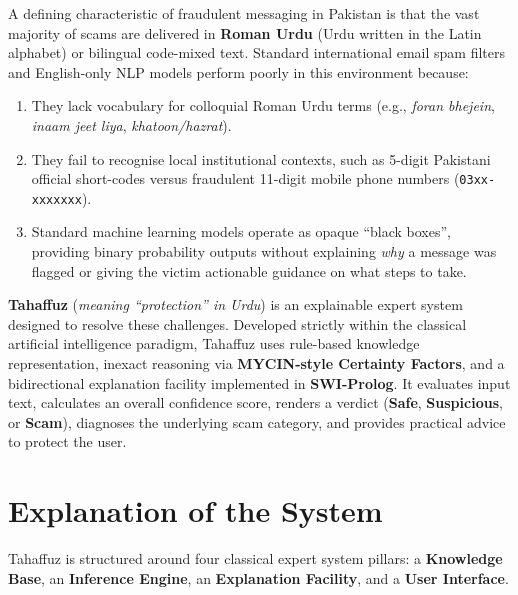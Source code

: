 \documentclass[11pt,a4paper]{article}
\begin{document}
A defining characteristic of fraudulent messaging in Pakistan is that the vast majority of scams are delivered in \textbf{Roman Urdu} (Urdu written in the Latin alphabet) or bilingual code-mixed text. Standard international email spam filters and English-only NLP models perform poorly in this environment because:
\begin{enumerate}[noitemsep]
    \item They lack vocabulary for colloquial Roman Urdu terms (e.g., \textit{foran bhejein}, \textit{inaam jeet liya}, \textit{khatoon/hazrat}).
    \item They fail to recognise local institutional contexts, such as 5-digit Pakistani official short-codes versus fraudulent 11-digit mobile phone numbers (\texttt{03xx-xxxxxxx}).
    \item Standard machine learning models operate as opaque ``black boxes'', providing binary probability outputs without explaining \textit{why} a message was flagged or giving the victim actionable guidance on what steps to take.
\end{enumerate}

\textbf{Tahaffuz} (\textit{meaning ``protection'' in Urdu}) is an explainable expert system designed to resolve these challenges. Developed strictly within the classical artificial intelligence paradigm, Tahaffuz uses rule-based knowledge representation, inexact reasoning via \textbf{MYCIN-style Certainty Factors}, and a bidirectional explanation facility implemented in \textbf{SWI-Prolog}. It evaluates input text, calculates an overall confidence score, renders a verdict (\textbf{Safe}, \textbf{Suspicious}, or \textbf{Scam}), diagnoses the underlying scam category, and provides practical advice to protect the user.

\bigskip

\section{Explanation of the System}

Tahaffuz is structured around four classical expert system pillars: a \textbf{Knowledge Base}, an \textbf{Inference Engine}, an \textbf{Explanation Facility}, and a \textbf{User Interface}.
\end{document}
